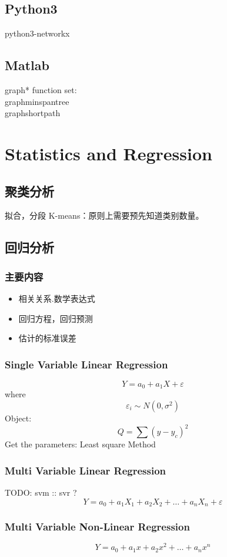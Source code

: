 \documentclass[12pt,a4paper]{article} \usepackage{kurier}
\begin{document}
\begin{CJK}{UTF8}{gkai}
\begin{multicols}{2}
	\subsection{Python3}
		python3-networkx
	\subsection{Matlab}
		graph* function set:\\
			graphminspantree\\
			graphshortpath\\
\end{multicols}

\newpage
\section{Statistics and Regression}
\begin{multicols}{2}
	\subsection{聚类分析}
	拟合，分段\newline
	K-means：原则上需要预先知道类别数量。
	\subsection{回归分析}
		\subsubsection{主要内容}
			\begin{itemize}
			\item 相关关系.数学表达式
			\item 回归方程，回归预测
			\item 估计的标准误差
			\end{itemize}
		\subsubsection{Single Variable Linear Regression}
			\[ Y = a_0 + a_1 X + \varepsilon \] 
			where
			\[ \varepsilon_i \sim N(0,\sigma^2) \]
			Object:
			\[ Q = \sum{(y - y_c)^2} \]
			Get the parameters: Least square Method
		\subsubsection{Multi Variable Linear Regression}
			TODO: svm :: svr ?
			\[ Y = a_0 + a_1 X_1 + a_2 X_2 + \ldots + a_n X_n + \varepsilon \]
		\subsubsection{Multi Variable Non-Linear Regression}
			\[ Y = a_0 + a_1 x + a_2 x^2 + \ldots + a_n x^n \]

\end{multicols}
\end{CJK}
\end{document}
